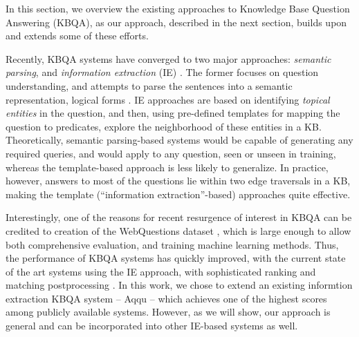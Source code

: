In this section, we overview the existing approaches to Knowledge Base Question Answering (KBQA), as our approach, described in the next section, builds upon and extends some of these efforts. 

Recently, KBQA systems have converged to two major approaches: {\em semantic parsing}, and {\em information extraction} (IE) \cite{yao2014freebase}.
The former focuses on question understanding, and attempts to parse the sentences into a semantic representation, \eg logical forms \cite{Berant:EMNLP13,berant2014semantic,berant2015imitation}. IE approaches \cite{ACCU:2015,yih2015semantic,yao2014information} are based on identifying \textit{topical entities} in the question, and then, using pre-defined templates for mapping the question to predicates, explore the neighborhood of these entities in a KB.
Theoretically, semantic parsing-based systems would be capable of generating any required queries, and would apply to any question, seen or unseen in training, whereas the template-based approach is less likely to generalize. In practice, however, answers to most of the questions lie within two edge traversals in a KB, making the template (``information extraction''-based) approaches quite effective.

Interestingly, one of the reasons for recent resurgence of interest in KBQA can be credited to creation of the WebQuestions dataset \cite{Berant:EMNLP13}, which is large enough to allow both comprehensive evaluation, and training machine learning methods.
Thus, the performance of KBQA systems has quickly improved, with the current state of the art systems using the IE approach, with sophisticated ranking and matching postprocessing \cite{yih2015semantic}.
In this work, we chose to extend an existing informtion extraction KBQA system -- Aqqu \cite{ACCU:2015} -- which achieves one of the highest scores among publicly available systems.
However, as we will show, our approach is general and can be incorporated into other IE-based systems as well.


